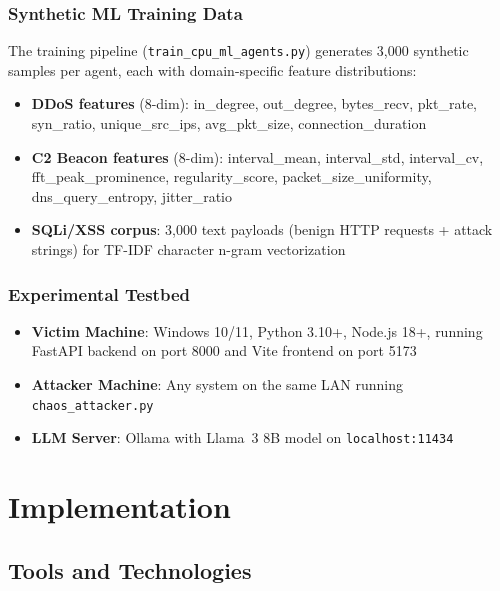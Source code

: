 \documentclass[12pt, a4paper]{report}
\begin{document}
\subsection{Synthetic ML Training Data}

The training pipeline (\texttt{train\_cpu\_ml\_agents.py}) generates 3,000 synthetic samples per agent, each with domain-specific feature distributions:

\begin{itemize}
    \item \textbf{DDoS features} (8-dim): in\_degree, out\_degree, bytes\_recv, pkt\_rate, syn\_ratio, unique\_src\_ips, avg\_pkt\_size, connection\_duration
    \item \textbf{C2 Beacon features} (8-dim): interval\_mean, interval\_std, interval\_cv, fft\_peak\_prominence, regularity\_score, packet\_size\_uniformity, dns\_query\_entropy, jitter\_ratio
    \item \textbf{SQLi/XSS corpus}: 3,000 text payloads (benign HTTP requests + attack strings) for TF-IDF character n-gram vectorization
\end{itemize}

\subsection{Experimental Testbed}

\begin{itemize}
    \item \textbf{Victim Machine}: Windows 10/11, Python 3.10+, Node.js 18+, running FastAPI backend on port 8000 and Vite frontend on port 5173
    \item \textbf{Attacker Machine}: Any system on the same LAN running \texttt{chaos\_attacker.py}
    \item \textbf{LLM Server}: Ollama with Llama~3 8B model on \texttt{localhost:11434}
\end{itemize}


\chapter{Implementation}

\section{Tools and Technologies}
\end{document}
